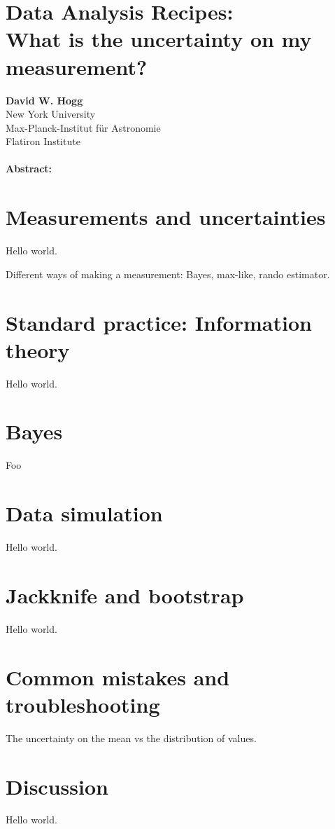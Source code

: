 \documentclass[12pt, letterpaper]{article}
\begin{document}
\section*{Data Analysis Recipes:\\
  What is the uncertainty on my measurement?}

\textbf{David W. Hogg} \\
{\footnotesize New York University} \\
{\footnotesize Max-Planck-Institut f\"ur Astronomie} \\
{\footnotesize Flatiron Institute}

\paragraph{Abstract:}

\section{Measurements and uncertainties}

Hello world.

Different ways of making a measurement: Bayes, max-like, rando estimator.

\section{Standard practice: Information theory}

Hello world.

\section{Bayes}

Foo

\section{Data simulation}

Hello world.

\section{Jackknife and bootstrap}

Hello world.

\section{Common mistakes and troubleshooting}

The uncertainty on the mean vs the distribution of values.

\section{Discussion}

Hello world.
\end{document}
